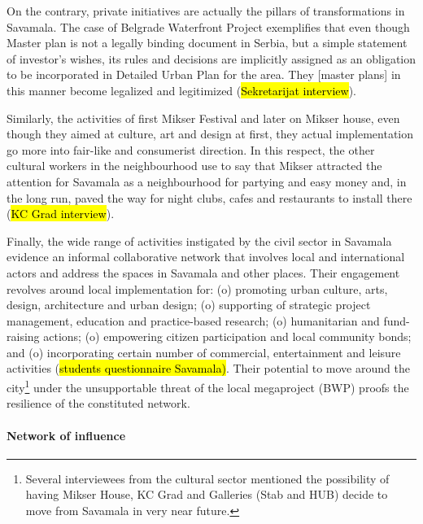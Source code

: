 \documentclass[11pt]{report}
\begin{document}
On the contrary, private initiatives are actually the pillars of transformations in Savamala. The case of Belgrade Waterfront Project exemplifies that even though Master plan is not a legally binding document in Serbia, but a simple statement of investor's wishes, its rules and decisions are implicitly assigned as an obligation to be incorporated in Detailed Urban Plan for the area.
They [master plans] in this manner become legalized and legitimized (\hl{Sekretarijat interview}).

Similarly, the activities of first Mikser Festival and later on Mikser house, even though they aimed at culture, art and design at first, they actual implementation go more into fair-like and consumerist direction.
In this respect, the other cultural workers in the neighbourhood use to say that Mikser attracted the attention for Savamala as a neighbourhood for partying and easy money and, in the long run, paved the way for night clubs, cafes and restaurants to install there
(\hl{KC Grad interview}).

Finally, the wide range of activities instigated by the civil sector in Savamala evidence an informal collaborative network that involves local and international actors and address the spaces in Savamala and other places.
Their engagement revolves around local implementation for:
(o) promoting urban culture, arts, design, architecture and urban design;
(o) supporting of strategic project management, education and practice-based research;
(o) humanitarian and fund-raising actions;
(o) empowering citizen participation and local community bonds;
and
(o) incorporating certain number of commercial, entertainment and leisure activities
(\hl{students questionnaire Savamala)}.
Their potential to move around the city\footnote{Several interviewees from the cultural sector mentioned the possibility of having Mikser House, KC Grad and Galleries (Stab and HUB) decide to move from Savamala in very near future.}
under the unsupportable threat of the local megaproject (BWP) proofs the resilience of the constituted network.  

\paragraph{Network of influence}
\end{document}
